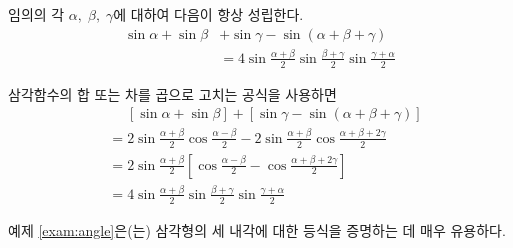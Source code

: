 \documentclass[11pt, a4paper]{book}
\begin{document}
\begin{example}\label{exam:angle}
	임의의 각 $\alpha,\;\beta,\;\gamma$에 대하여 다음이 항상 성립한다.
	\begin{align*}
		\sin \alpha + \sin \beta &+ \sin \gamma - \sin(\alpha + \beta+ \gamma) \\
		&= 4 \sin \frac{\alpha+\beta}{2} \sin \frac{\beta+\gamma}{2} \sin \frac{\gamma+\alpha}{2}
	\end{align*}
	\begin{solution}
		삼각함수의 합 또는 차를 곱으로 고치는 공식을 사용하면
		\begin{align*}
			& \phantom{=}\left[\sin \alpha + \sin \beta \right] + \left[\sin \gamma - \sin (\alpha +\beta + \gamma)\right] \\
			&= 2 \sin \frac{\alpha+\beta}{2} \cos \frac{\alpha-\beta}{2} - 2 \sin \frac{\alpha+\beta}{2} \cos \frac{\alpha+\beta + 2\gamma}{2} \\
			&= 2 \sin \frac{\alpha+\beta}{2}\left[\cos \frac{\alpha-\beta}{2} -\cos \frac{\alpha+\beta+2\gamma}{2}\right] \\
			&= 4 \sin \frac{\alpha+\beta}{2} \sin \frac{\beta+\gamma}{2} \sin \frac{\gamma+\alpha}{2}
		\end{align*}
	\end{solution}
\end{example}
\vspace{1em}
예제 \ref{exam:angle}은(는) 삼각형의 세 내각에 대한 등식을 증명하는 데 매우 유용하다. 
\vspace{1em}
\end{document}
